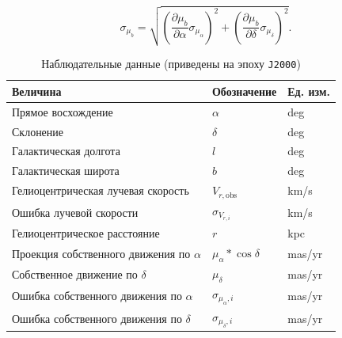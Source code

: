 \documentclass{matmex-diploma-custom}
\begin{document}
\begin{equation}
        \sigma_{\mu_b} = \sqrt{\left(\frac{\partial \mu_b}{\partial \alpha} \sigma_{\mu_{\alpha}} \right)^2 + \left(\frac{\partial \mu_b}{\partial\delta} \sigma_{\mu_{\delta}} \right)^2}.
\end{equation}


\begin{table}[h!]
\centering
\caption{Наблюдательные данные (приведены на эпоху \texttt{J2000})}
\begin{tabular}{|l|l|l|}
\hline
\textbf{Величина} & \textbf{Обозначение} & \textbf{Ед. изм.} \\
\hline
Прямое восхождение & $\alpha$ & deg \\
Склонение & $\delta$ & deg \\
Галактическая долгота & $l$ & deg \\
Галактическая широта & $b$ & deg \\
\hline
Гелиоцентрическая лучевая скорость & $V_{r, \mathrm{obs}}$ & km/s \\
Ошибка лучевой скорости & $\sigma_{V_{r, i}}$ & km/s \\
Гелиоцентрическое расстояние & $r$ & kpc \\
\hline
Проекция собственного движения по $\alpha$  & $\mu_{\alpha}* \cos{\delta}$ & mas/yr \\
Собственное движение по $\delta$  & $\mu_{\delta}$ & mas/yr \\
Ошибка собственного движения по $\alpha$  & $\sigma_{\mu_{\alpha}, i}$ & mas/yr \\
Ошибка собственного движения по $\delta$  & $\sigma_{\mu_{\delta}, i}$ & mas/yr \\
\hline
\end{tabular}
\end{table}
\end{document}
